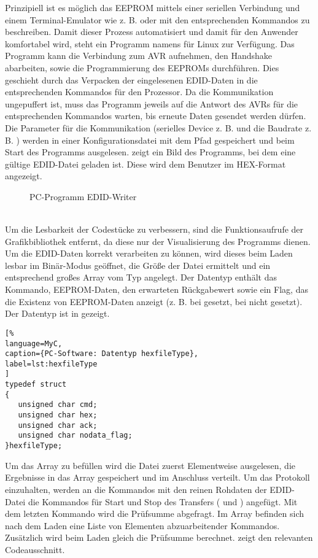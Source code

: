 Prinzipiell ist es möglich das EEPROM mittels einer seriellen Verbindung und einem Terminal-Emulator wie z. B.  oder  mit den entsprechenden Kommandos zu beschreiben. Damit dieser Prozess automatisiert und damit für den Anwender komfortabel wird, steht ein Programm namens  für Linux zur Verfügung. Das Programm kann die Verbindung zum AVR aufnehmen, den Handshake abarbeiten, sowie die Programmierung des EEPROMs durchführen. Dies geschieht durch das Verpacken der eingelesenen EDID-Daten in die entsprechenden Kommandos für den Prozessor. Da die Kommunikation ungepuffert ist, muss das Programm jeweils auf die Antwort des AVRs für die entsprechenden Kommandos warten, bis erneute Daten gesendet werden dürfen. Die Parameter für die Kommunikation (serielles Device z. B.  und die Baudrate z. B. ) werden in einer Konfigurationsdatei mit dem Pfad  gespeichert und beim Start des Programms ausgelesen.  zeigt ein Bild des Programms, bei dem eine gültige EDID-Datei geladen ist. Diese wird dem Benutzer im HEX-Format angezeigt. 
\begin{figure}[htp]
	\center
    \caption{PC-Programm EDID-Writer}
    \label{fig:edid_writer1} 
\end{figure}\\
Um die Lesbarkeit der Codestücke zu verbessern, sind die Funktionsaufrufe der Grafikbibliothek  entfernt, da diese nur der Visualisierung des Programms dienen.\\
Um die EDID-Daten korrekt verarbeiten zu können, wird dieses beim Laden lesbar im Binär-Modus geöffnet, die Größe der Datei ermittelt und ein entsprechend großes Array  vom Typ  angelegt. Der Datentyp enthält das Kommando, EEPROM-Daten, den erwarteten Rückgabewert sowie ein Flag, das die Existenz von EEPROM-Daten anzeigt (z. B. bei  gesetzt, bei  nicht gesetzt). Der Datentyp  ist in  gezeigt.
\begin{lstlisting}[%
language=MyC,
caption={PC-Software: Datentyp hexfileType},
label=lst:hexfileType
]
typedef struct
{
   unsigned char cmd;
   unsigned char hex;
   unsigned char ack;
   unsigned char nodata_flag;
}hexfileType;
\end{lstlisting}%
Um das Array  zu befüllen wird die Datei zuerst Elementweise ausgelesen, die Ergebnisse in das Array  gespeichert und im Anschluss verteilt. Um das Protokoll einzuhalten, werden an die Kommandos mit den reinen Rohdaten der EDID-Datei die Kommandos für Start und Stop des Transfers ( und ) angefügt. Mit dem letzten Kommando wird die Prüfsumme abgefragt. Im Array  befinden sich nach dem Laden eine Liste von Elementen abzuarbeitender Kommandos. Zusätzlich wird beim Laden gleich die Prüfsumme berechnet.  zeigt den relevanten Codeausschnitt. 
